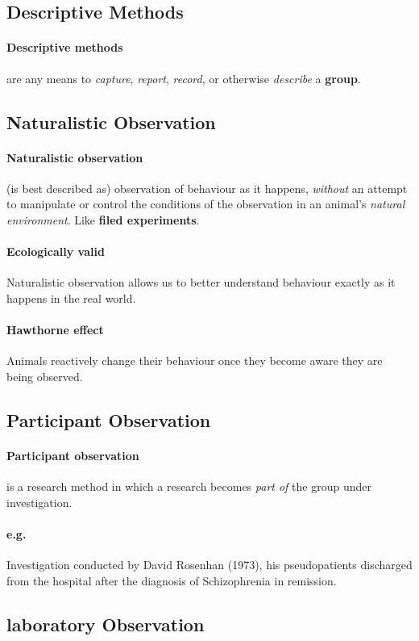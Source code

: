 \documentclass{article}
\begin{document}
 	\subsection{Descriptive Methods}
 	\paragraph{Descriptive methods} are any means to \emph{capture}, \emph{report}, \emph{record}, or otherwise \emph{describe} a \textbf{group}.
 	\subsection{Naturalistic Observation}
 	\paragraph{Naturalistic observation} (is best described as) observation of behaviour as it happens, \emph{without} an attempt to manipulate or control the conditions of the observation in an animal's \emph{natural environment}. Like \textbf{filed experiments}.
 	\paragraph{Ecologically valid} Naturalistic observation allows us to better understand behaviour exactly as it happens in the real world.
 	\paragraph{Hawthorne effect} Animals reactively change their behaviour once they become aware they are being observed.
 	\subsection{Participant Observation}
 	\paragraph{Participant observation} is a research method in which a research becomes \emph{part of} the group under investigation.
 	\paragraph{e.g.} Investigation conducted by David Rosenhan (1973), his pseudopatients discharged from the hospital after the diagnosis of Schizophrenia in remission.
 	\subsection{laboratory Observation}
\end{document}
